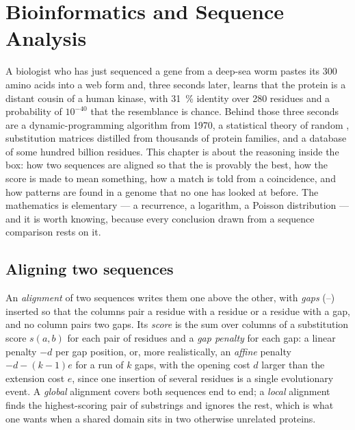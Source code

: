 \chapter{Bioinformatics and Sequence Analysis}\label{ch:b3:bioinformatics}

A biologist who has just sequenced a gene from a deep-sea worm pastes
its \num{300} amino acids into a web form and, three seconds later,
learns that the protein is a distant cousin of a human kinase, with
\qty{31}{\%} identity over \num{280} residues and a probability of
$10^{-40}$ that the resemblance is chance. Behind those three seconds
are a dynamic-programming algorithm from 1970, a statistical theory of
random , substitution matrices distilled from thousands of
protein families, and a database of some hundred billion residues.
This chapter is about the reasoning inside the box: how two sequences
are aligned so that the  is provably the best, how the score
is made to mean something, how a match is told from a coincidence,
and how patterns are found in a genome that no one has looked at
before. The mathematics is elementary --- a recurrence, a logarithm, a
Poisson distribution --- and it is worth knowing, because every
conclusion drawn from a sequence comparison rests on it.

\section{Aligning two sequences}

\begin{definition}\label{def:b3:bioinformatics:alignment}
An \emph{alignment} of two sequences writes them one above the other,
with \emph{gaps} (--) inserted so that the columns pair a residue with a
residue or a residue with a gap, and no column pairs two gaps. Its
\emph{score} is the sum over columns of a substitution score $s(a,b)$
for each pair of residues and a \emph{gap penalty} for each gap: a
linear penalty $-d$ per gap position, or, more realistically, an
\emph{affine} penalty $-d - (k-1)e$ for a run of $k$ gaps, with the
opening cost $d$ larger than the extension cost $e$, since one
insertion of several residues is a single evolutionary event. A
\emph{global} alignment covers both sequences end to end; a \emph{local}
alignment finds the highest-scoring pair of substrings and ignores the
rest, which is what one wants when a shared domain sits in two
otherwise unrelated proteins.
\end{definition}

